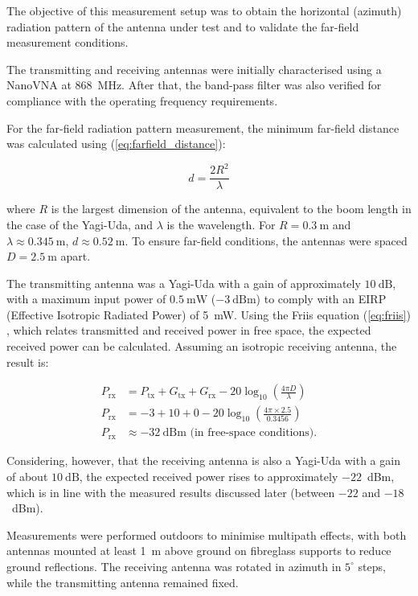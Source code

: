 The objective of this measurement setup was to obtain the horizontal (azimuth) radiation pattern of the antenna under test and to validate the far-field measurement conditions.

The transmitting and receiving antennas were initially characterised using a NanoVNA at 868~MHz. After that, the band-pass filter was also verified for compliance with the operating frequency requirements.

For the far-field radiation pattern measurement, the minimum far-field distance was calculated using (\ref{eq:farfield_distance}):

\begin{equation}
    d = \frac{2R^{2}}{\lambda}
    \label{eq:farfield_distance}
\end{equation}

where $R$ is the largest dimension of the antenna, equivalent to the boom length in the case of the Yagi-Uda, and $\lambda$ is the wavelength. For $R = 0.3~\text{m}$ and $\lambda \approx 0.345~\text{m}$, $d \approx 0.52~\text{m}$. To ensure far-field conditions, the antennas were spaced $D = 2.5~\text{m}$ apart.


The transmitting antenna was a Yagi-Uda with a gain of approximately $10~\text{dB}$, with a maximum input power of $0.5~\text{mW}$ ($-3~\text{dBm}$) to comply with an EIRP (Effective Isotropic Radiated Power) of 5~mW. Using the Friis equation (\ref{eq:friis}) \cite{Friis1946}, which relates transmitted and received power in free space, the expected received power can be calculated. Assuming an isotropic receiving antenna, the result is:

\begin{align}
    P_{\mathrm{rx}} &= P_{\mathrm{tx}} + G_{\mathrm{tx}} + G_{\mathrm{rx}} - 20 \log_{10} \left( \frac{4 \pi D}{\lambda} \right) \label{eq:friis} \\
    P_{\mathrm{rx}} &= -3 + 10 + 0 - 20 \log_{10} \left( \frac{4 \pi \times 2.5}{0.3456} \right)  \\
    P_{\mathrm{rx}} &\approx -32~\text{dBm (in free-space conditions).} 
\end{align}

Considering, however, that the receiving antenna is also a Yagi-Uda with a gain of about $10~\text{dB}$, the expected received power rises to approximately $-22$~dBm, which is in line with the measured results discussed later (between $-22$ and $-18$~dBm).

Measurements were performed outdoors to minimise multipath effects, with both antennas mounted at least 1~m above ground on fibreglass supports to reduce ground reflections. The receiving antenna was rotated in azimuth in $5^{\circ}$ steps, while the transmitting antenna remained fixed.

